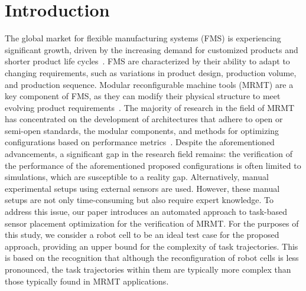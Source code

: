 \documentclass{svproc}
\begin{document}
\section{Introduction}
The global market for flexible manufacturing systems (FMS) is experiencing significant growth, driven by the increasing demand for customized products and shorter product life cycles~\cite{westkaemperEinfuehrungOrganisationProduktion2006}. FMS are characterized by their ability to adapt to changing requirements, such as variations in product design, production volume, and production sequence. Modular reconfigurable machine tools (MRMT) are a key component of FMS, as they can modify their physical structure to meet evolving product requirements~\cite{Padayachee2012}.
The majority of research in the field of MRMT has concentrated on the development of architectures that adhere to open or semi-open standards, the modular components, and methods for optimizing configurations based on performance metrics~\cite{gadallaRecentAdvancesResearch2017, xuMethodDesignModular2017}.
Despite the aforementioned advancements, a significant gap in the research field remains: the verification of the performance of the aforementioned proposed configurations is often limited to simulations, which are susceptible to a reality gap. Alternatively, manual experimental setups using external sensors are used. However, these manual setups are not only time-consuming but also require expert knowledge.
To address this issue, our paper introduces an automated approach to task-based sensor placement optimization for the verification of MRMT. For the purposes of this study, we consider a robot cell to be an ideal test case for the proposed approach, providing an upper bound for the complexity of task trajectories. This is based on the recognition that although the reconfiguration of robot cells is less pronounced, the task trajectories within them are typically more complex than those typically found in MRMT applications.
\end{document}
